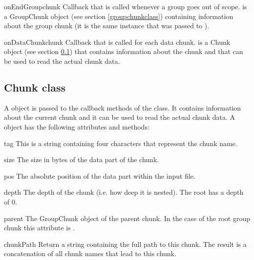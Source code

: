 \begin{methoddesc}{onEndGroup}{chunk}
Callback that is called whenever a group goes out of scope.
 is a GroupChunk object (see section \ref{groupchunkclass})
containing information about the group chunk (it is the same instance that was passed to ).
\end{methoddesc}

\begin{methoddesc}{onDataChunk}{chunk}
Callback that is called for each data chunk.
 is a Chunk object (see section \ref{chunkclass}) that contains
information about the chunk and that can be used to read the actual chunk data.
\end{methoddesc}

\subsection{Chunk class}
\label{chunkclass}

A  object is passed to the callback methods of the
 class. It contains information about the current
chunk and it can be used to read the actual chunk data.
A  object has the following attributes and methods:

\begin{memberdesc}{tag}
This is a string containing four characters that represent the chunk
name.
\end{memberdesc}

\begin{memberdesc}{size}
The size in bytes of the data part of the chunk.
\end{memberdesc}

\begin{memberdesc}{pos}
The absolute position of the data part within the input file.
\end{memberdesc}

\begin{memberdesc}{depth}
The depth of the chunk (i.e. how deep it is nested). The root
has a depth of 0.
\end{memberdesc}

\begin{memberdesc}{parent}
The GroupChunk object of the parent chunk. In the case of the root group
chunk this attribute is .
\end{memberdesc}


\begin{methoddesc}{chunkPath}{}
Return a string containing the full path to this chunk.
The result is a concatenation of all chunk names that lead to this chunk.
\end{methoddesc}

